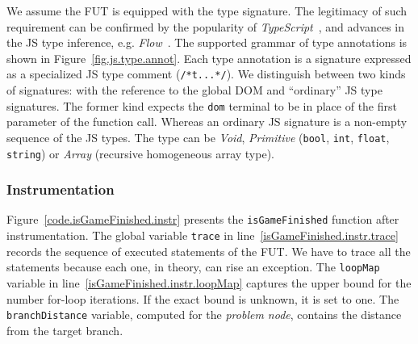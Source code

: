 We assume the FUT is equipped with the type signature. The legitimacy of such requirement can be confirmed by the popularity of \emph{TypeScript}~\cite{typescript}, and advances in the JS type inference, e.g. \emph{Flow}~\cite{flow}. The supported grammar of type annotations is shown in Figure~\ref{fig.js.type.annot}. Each type annotation is a signature expressed as a specialized JS type comment (\texttt{/*t...*/}). We distinguish between two kinds of signatures: with the reference to the global DOM and ``ordinary'' JS type signatures. The former kind expects the \texttt{dom} terminal to be in place of the first parameter of the function call. Whereas an ordinary JS signature is a non-empty sequence of the JS types. The type can be \emph{Void}, \emph{Primitive} (\texttt{bool}, \texttt{int}, \texttt{float}, \texttt{string}) or \emph{Array} (recursive homogeneous array type).

\subsubsection{Instrumentation}
\label{sub.sec.instrument}

Figure~\ref{code.isGameFinished.instr} presents the \texttt{isGameFinished} function after instrumentation. The global variable \texttt{trace} in line~\ref{isGameFinished.instr.trace} records the sequence of executed statements of the FUT. We have to trace all the statements because each one, in theory, can rise an exception. The \texttt{loopMap} variable in line~\ref{isGameFinished.instr.loopMap} captures the upper bound for the number for-loop iterations. If the exact bound is unknown, it is set to one. The \texttt{branchDistance} variable, computed for the \emph{problem node}, contains the distance~\cite{tracey1998automated} from the target branch.


